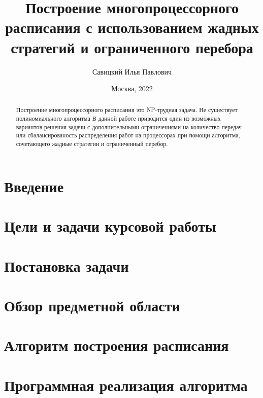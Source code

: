 \documentclass[12pt]{article}
\author{Савицкий Илья Павлович}
\title{Построение многопроцессорного расписания с использованием жадных стратегий и ограниченного перебора}
\date{Москва, 2022}
\begin{document}

\newpage
\begin{abstract}
    Построение многопроцессорного расписания это NP-трудная задача. Не существует полиномиального алгоритма  В данной работе приводится один из возможных вариантов решения задачи с дополнительными ограничениями на количество передач или сбалансированость распределения работ на процессорах при помощи алгоритма, сочетающего жадные стратегии и ограниченный перебор.
\end{abstract}
\newpage
\tableofcontents
\newpage
\section{Введение}

\newpage
\section{Цели и задачи курсовой работы}

\newpage
\section{Постановка задачи}

\newpage
\section{Обзор предметной области}


\newpage
\section{Алгоритм построения расписания}


\newpage
\section{Программная реализация алгоритма}

\end{document}
